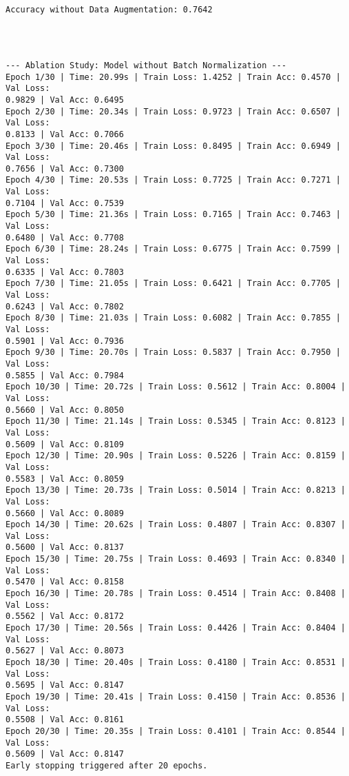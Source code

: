 \documentclass[11pt]{article}
\begin{document}
    \begin{Verbatim}[commandchars=\\\{\}]
Accuracy without Data Augmentation: 0.7642
    \end{Verbatim}

    \begin{center}
    \end{center}
    { \hspace*{\fill} \\}
    
    \begin{Verbatim}[commandchars=\\\{\}]

--- Ablation Study: Model without Batch Normalization ---
Epoch 1/30 | Time: 20.99s | Train Loss: 1.4252 | Train Acc: 0.4570 | Val Loss:
0.9829 | Val Acc: 0.6495
Epoch 2/30 | Time: 20.34s | Train Loss: 0.9723 | Train Acc: 0.6507 | Val Loss:
0.8133 | Val Acc: 0.7066
Epoch 3/30 | Time: 20.46s | Train Loss: 0.8495 | Train Acc: 0.6949 | Val Loss:
0.7656 | Val Acc: 0.7300
Epoch 4/30 | Time: 20.53s | Train Loss: 0.7725 | Train Acc: 0.7271 | Val Loss:
0.7104 | Val Acc: 0.7539
Epoch 5/30 | Time: 21.36s | Train Loss: 0.7165 | Train Acc: 0.7463 | Val Loss:
0.6480 | Val Acc: 0.7708
Epoch 6/30 | Time: 28.24s | Train Loss: 0.6775 | Train Acc: 0.7599 | Val Loss:
0.6335 | Val Acc: 0.7803
Epoch 7/30 | Time: 21.05s | Train Loss: 0.6421 | Train Acc: 0.7705 | Val Loss:
0.6243 | Val Acc: 0.7802
Epoch 8/30 | Time: 21.03s | Train Loss: 0.6082 | Train Acc: 0.7855 | Val Loss:
0.5901 | Val Acc: 0.7936
Epoch 9/30 | Time: 20.70s | Train Loss: 0.5837 | Train Acc: 0.7950 | Val Loss:
0.5855 | Val Acc: 0.7984
Epoch 10/30 | Time: 20.72s | Train Loss: 0.5612 | Train Acc: 0.8004 | Val Loss:
0.5660 | Val Acc: 0.8050
Epoch 11/30 | Time: 21.14s | Train Loss: 0.5345 | Train Acc: 0.8123 | Val Loss:
0.5609 | Val Acc: 0.8109
Epoch 12/30 | Time: 20.90s | Train Loss: 0.5226 | Train Acc: 0.8159 | Val Loss:
0.5583 | Val Acc: 0.8059
Epoch 13/30 | Time: 20.73s | Train Loss: 0.5014 | Train Acc: 0.8213 | Val Loss:
0.5660 | Val Acc: 0.8089
Epoch 14/30 | Time: 20.62s | Train Loss: 0.4807 | Train Acc: 0.8307 | Val Loss:
0.5600 | Val Acc: 0.8137
Epoch 15/30 | Time: 20.75s | Train Loss: 0.4693 | Train Acc: 0.8340 | Val Loss:
0.5470 | Val Acc: 0.8158
Epoch 16/30 | Time: 20.78s | Train Loss: 0.4514 | Train Acc: 0.8408 | Val Loss:
0.5562 | Val Acc: 0.8172
Epoch 17/30 | Time: 20.56s | Train Loss: 0.4426 | Train Acc: 0.8404 | Val Loss:
0.5627 | Val Acc: 0.8073
Epoch 18/30 | Time: 20.40s | Train Loss: 0.4180 | Train Acc: 0.8531 | Val Loss:
0.5695 | Val Acc: 0.8147
Epoch 19/30 | Time: 20.41s | Train Loss: 0.4150 | Train Acc: 0.8536 | Val Loss:
0.5508 | Val Acc: 0.8161
Epoch 20/30 | Time: 20.35s | Train Loss: 0.4101 | Train Acc: 0.8544 | Val Loss:
0.5609 | Val Acc: 0.8147
Early stopping triggered after 20 epochs.
    \end{Verbatim}
\end{document}
